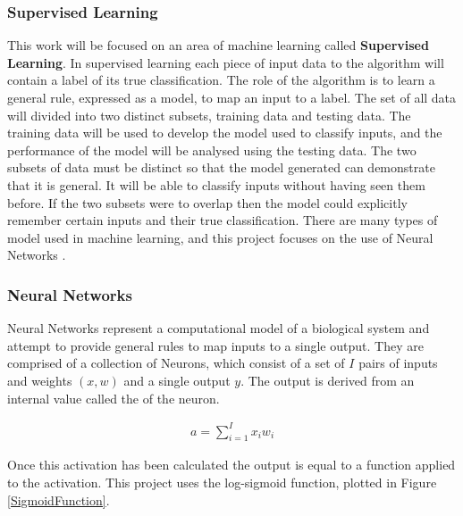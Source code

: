 \documentclass[12pt]{article}
\begin{document}
\subsubsection{Supervised Learning} \label{supervised}
This work will be focused on an area of machine learning called \textbf{Supervised Learning}. In supervised learning each piece of input data to the algorithm will contain a label of its true classification. The role of the algorithm is to learn a general rule, expressed as a model, to map an input to a label. The set of all data will divided into two distinct subsets, training data and testing data. The training data will be used to develop the model used to classify inputs, and the performance of the model will be analysed using the testing data. The two subsets of data must be distinct so that the model generated can demonstrate that it is general. It will be able to classify inputs without having seen them before. If the two subsets were to overlap then the model could explicitly remember certain inputs and their true classification.
\newline
\newline
There are many types of model used in machine learning, and this project focuses on the use of Neural Networks \cite{mackay2003information}.

\subsubsection{Neural Networks}
Neural Networks represent a computational model of a biological system and attempt to provide general rules to map inputs to a single output. They are comprised of a collection of Neurons, which consist of a set of $I$ pairs of inputs and weights $(x, w)$ and a single output $y$. The output is derived from an internal value called the  of the neuron.

\begin{align*}
a = \sum_{i = 1}^I x_i w_i
\end{align*}

Once this activation has been calculated the output is equal to a function applied to the activation. This project uses the log-sigmoid function, plotted in Figure \ref{SigmoidFunction}.
\end{document}
